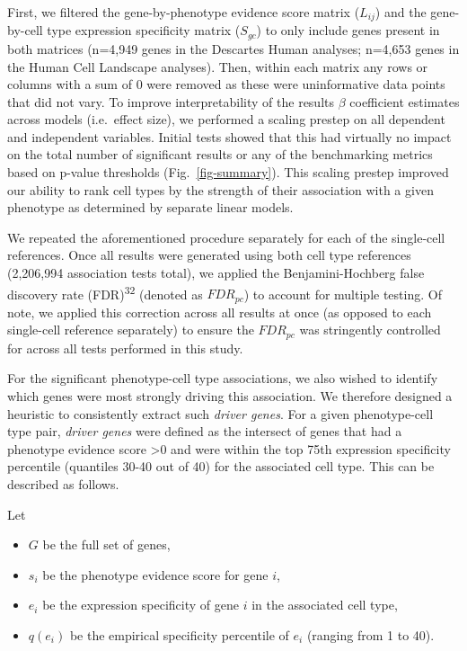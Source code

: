 \documentclass[
]{article}
\providecommand{\tightlist}{%
  \setlength{\itemsep}{0pt}\setlength{\parskip}{0pt}}
\begin{document}
First, we filtered the gene-by-phenotype evidence score matrix
(\(L_{ij}\)) and the gene-by-cell type expression specificity matrix
(\(S_{gc}\)) to only include genes present in both matrices (n=4,949
genes in the Descartes Human analyses; n=4,653 genes in the Human Cell
Landscape analyses). Then, within each matrix any rows or columns with a
sum of 0 were removed as these were uninformative data points that did
not vary. To improve interpretability of the results \(\beta\)
coefficient estimates across models (i.e.~effect size), we performed a
scaling prestep on all dependent and independent variables. Initial
tests showed that this had virtually no impact on the total number of
significant results or any of the benchmarking metrics based on p-value
thresholds (Fig.~\ref{fig-summary}). This scaling prestep improved our
ability to rank cell types by the strength of their association with a
given phenotype as determined by separate linear models.

We repeated the aforementioned procedure separately for each of the
single-cell references. Once all results were generated using both cell
type references (2,206,994 association tests total), we applied the
Benjamini-Hochberg false discovery rate (FDR)\textsuperscript{32}
(denoted as \(FDR_{pc}\)) to account for multiple testing. Of note, we
applied this correction across all results at once (as opposed to each
single-cell reference separately) to ensure the \(FDR_{pc}\) was
stringently controlled for across all tests performed in this study.

For the significant phenotype-cell type associations, we also wished to
identify which genes were most strongly driving this association. We
therefore designed a heuristic to consistently extract such \emph{driver
genes}. For a given phenotype-cell type pair, \emph{driver genes} were
defined as the intersect of genes that had a phenotype evidence score
\textgreater0 and were within the top 75th expression specificity
percentile (quantiles 30-40 out of 40) for the associated cell type.
This can be described as follows.

Let

\begin{itemize}
\tightlist
\item
  \(G\) be the full set of genes,
\item
  \(s_i\) be the phenotype evidence score for gene \(i\),
\item
  \(e_i\) be the expression specificity of gene \(i\) in the associated
  cell type,
\item
  \(q(e_i)\) be the empirical specificity percentile of \(e_i\) (ranging
  from 1 to 40).
\end{itemize}
\end{document}
